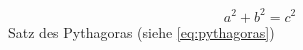 \begin{equation}
    \label{eq:pythagoras}
    a^2 + b^2 = c^2
\end{equation}
Satz des Pythagoras (siehe \ref{eq:pythagoras})
